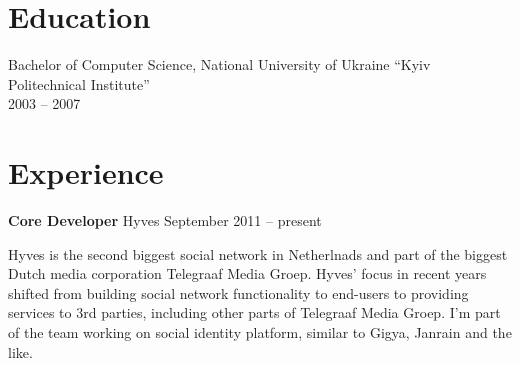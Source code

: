 \documentclass[margin]{res}
\begin{document}

\address{{\bf Address} \\ Mercatorplein 36-K \\ 1056CL, Amsterdam, The Netherlands}

\address{{\bf Contacts} \\ +31 (62) 980-61-41 \\ contact@mishkovskyi.net \\ skype: andriy.mishkovskyy \\ \href{http://mishkovskyi.net}{mishkovskyi.net}}

\begin{resume}


\section{Education}
Bachelor of Computer Science, National University of Ukraine ``Kyiv Politechnical Institute'' \\
2003 -- 2007

\section{Experience}

{\bf Core Developer} Hyves \hfill September 2011 -- present

Hyves is the second biggest social network in Netherlnads and part of the
biggest Dutch media corporation Telegraaf Media Groep. Hyves' focus in recent
years shifted from building social network functionality to end-users to
providing services to 3rd parties, including other parts of Telegraaf Media Groep.
I'm part of the team working on social identity platform, similar to Gigya,
Janrain and the like.


\end{resume}
\end{document}
